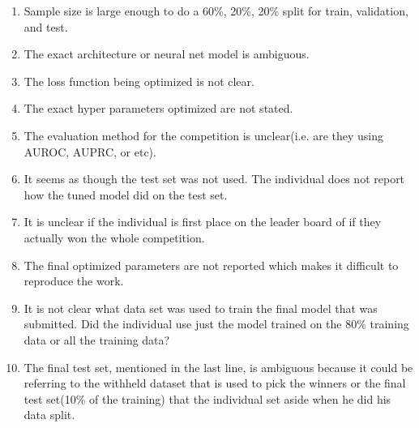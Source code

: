 \documentclass[11pt,letterpaper]{article}
\begin{document}
\begin{enumerate}[labelindent=0pt]
\item
Sample size is large enough to do a 60\%, 20\%, 20\% split for train,
validation, and test.
\item
The exact architecture or neural net model is ambiguous.
\item
The loss function being optimized is not clear.
\item
The exact hyper parameters optimized are not stated.
\item
The evaluation method for the competition is unclear(i.e. are they using AUROC,
AUPRC, or etc).
\item
It seems as though the test set was not used.  The individual does not report
how the tuned model did on the test set. 
\item
It is unclear if the individual is first place on the leader board of if they
actually won the whole competition.
\item
The final optimized parameters are not reported which makes it difficult to
reproduce the work.
\item
It is not clear what data set was used to train the final model that was
submitted.  Did the individual use just the model trained on the 80\% training
data or all the training data? 
\item
The final test set, mentioned in the last line, is ambiguous because it could be
referring to the withheld dataset that is used to pick the winners or the final
test set(10\% of the training) that the individual set aside when he did his data split.
\end{enumerate}
\end{document}
